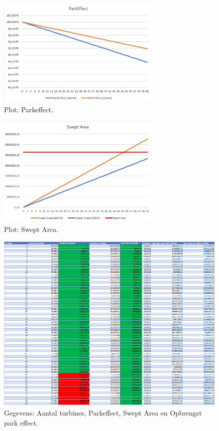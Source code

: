 \begin{figure}[H]
\centering
\includegraphics[width=0.7\textwidth]{IMG/data/overzicht/parkeffect_graph.PNG}
\caption{Plot: Parkeffect.}
\label{fig:ParkEffectGraph}
\end{figure}

\begin{figure}[H]
\centering
\includegraphics[width=0.7\textwidth]{IMG/data/overzicht/SweptAera_graph.PNG}
\caption{Plot: Swept Area.}
\label{fig:SweptArea}
\end{figure}

\begin{figure}[H]
\centering
\includegraphics[width=1\textwidth]{IMG/data/overzicht/Parkeffect.PNG}
\caption{Gegevens: Aantal turbines, Parkeffect, Swept Area en Opbrengst park effect.}
\label{fig:Parkeffect_table}
\end{figure}